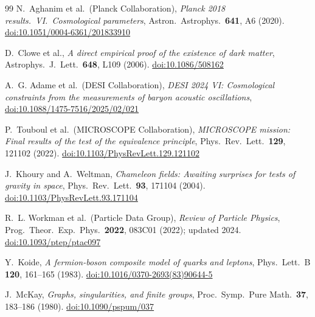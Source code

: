 \documentclass[11pt,a4paper]{article}
\theoremstyle{definition}
\theoremstyle{remark}
\begin{document}
\begin{thebibliography}{99}
N.~Aghanim et al.\ (Planck Collaboration),
\textit{Planck 2018 results.\ VI.\ Cosmological parameters},
Astron.\ Astrophys.\ \textbf{641}, A6 (2020).
\href{https://doi.org/10.1051/0004-6361/201833910}{doi:10.1051/0004-6361/201833910}

D.~Clowe et al.,
\textit{A direct empirical proof of the existence of dark matter},
Astrophys.\ J.\ Lett.\ \textbf{648}, L109 (2006).
\href{https://doi.org/10.1086/508162}{doi:10.1086/508162}

A.~G. Adame et al.\ (DESI Collaboration),
\textit{DESI 2024 VI: Cosmological constraints from the measurements
of baryon acoustic oscillations},
\href{https://doi.org/10.1088/1475-7516/2025/02/021}{doi:10.1088/1475-7516/2025/02/021}

P.~Touboul et al.\ (MICROSCOPE Collaboration),
\textit{MICROSCOPE mission: Final results of the test of the equivalence
principle},
Phys.\ Rev.\ Lett.\ \textbf{129}, 121102 (2022).
\href{https://doi.org/10.1103/PhysRevLett.129.121102}{doi:10.1103/PhysRevLett.129.121102}

J.~Khoury and A.~Weltman,
\textit{Chameleon fields: Awaiting surprises for tests of gravity in space},
Phys.\ Rev.\ Lett.\ \textbf{93}, 171104 (2004).
\href{https://doi.org/10.1103/PhysRevLett.93.171104}{doi:10.1103/PhysRevLett.93.171104}

R.~L. Workman et al.\ (Particle Data Group),
\textit{Review of Particle Physics},
Prog.\ Theor.\ Exp.\ Phys.\ \textbf{2022}, 083C01 (2022);
updated 2024.
\href{https://doi.org/10.1093/ptep/ptac097}{doi:10.1093/ptep/ptac097}

Y.~Koide,
\textit{A fermion-boson composite model of quarks and leptons},
Phys.\ Lett.\ B \textbf{120}, 161--165 (1983).
\href{https://doi.org/10.1016/0370-2693(83)90644-5}{doi:10.1016/0370-2693(83)90644-5}

J.~McKay,
\textit{Graphs, singularities, and finite groups},
Proc.\ Symp.\ Pure Math.\ \textbf{37}, 183--186 (1980).
\href{https://doi.org/10.1090/pspum/037}{doi:10.1090/pspum/037}

\end{thebibliography}
\end{document}
